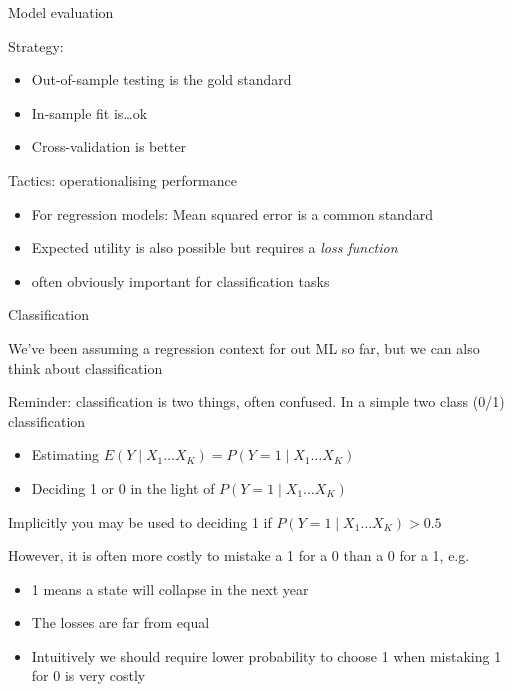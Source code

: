 \documentclass{hertieteaching}
\begin{document}

\begin{frame}{Model evaluation}

Strategy:
\begin{itemize}
  \item Out-of-sample testing is the gold standard
  \item In-sample fit is\ldots ok
  \item Cross-validation is better
\end{itemize}
Tactics: operationalising performance
\begin{itemize}
  \item For regression models: Mean squared error is a common standard
  \item Expected utility is also possible but requires a \textit{loss function}
  \item often obviously important for classification tasks
\end{itemize}

\end{frame}



\begin{frame}{Classification}

We've been assuming a regression context for out ML so far, but we can also think about classification

Reminder: classification is two things, often confused. In a simple two class (0/1) classification 
\begin{itemize}
  \item Estimating $E(Y \mid X_1 \ldots X_K) = P(Y=1 \mid X_1 \ldots X_K)$
  \item Deciding 1 or 0 in the light of $P(Y=1 \mid X_1 \ldots X_K)$
\end{itemize}

Implicitly you may be used to deciding 1 if $P(Y=1 \mid X_1 \ldots X_K) > 0.5$ 

However, it is often more costly to mistake a 1 for a 0 than a 0 for a 1, e.g.
\begin{itemize}
  \item 1 means a state will collapse in the next year \parencite[e.g.][]{King.Zeng2001a}
  \item The losses are far from equal
  \item Intuitively we should require lower probability to choose 1 when mistaking 1 for 0 is very costly  
\end{itemize}
\end{frame}
\end{document}
